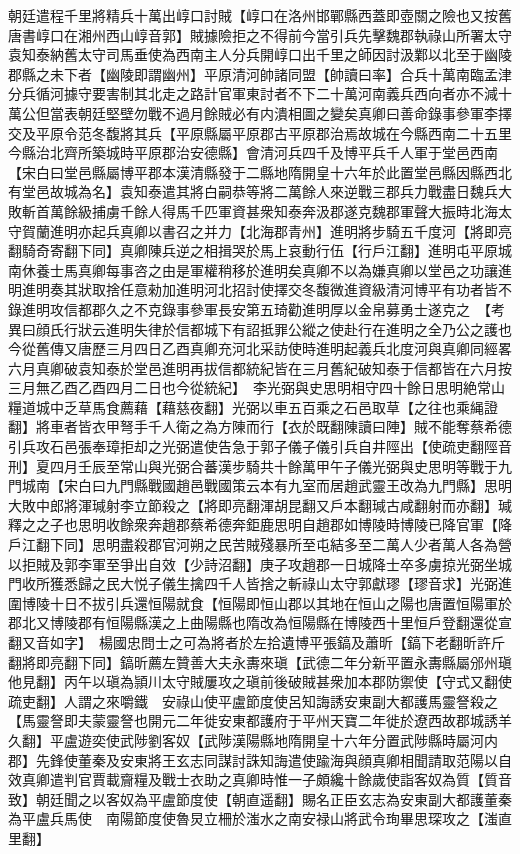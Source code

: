 朝廷遣程千里將精兵十萬出崞口討賊【崞口在洛州邯鄲縣西蓋即壺關之險也又按舊唐書崞口在湘州西山崞音郭】賊據險拒之不得前今當引兵先擊魏郡執祿山所署太守袁知泰納舊太守司馬垂使為西南主人分兵開崞口出千里之師因討汲鄴以北至于幽陵郡縣之未下者【幽陵即謂幽州】平原清河帥諸同盟【帥讀曰率】合兵十萬南臨孟津分兵循河據守要害制其北走之路計官軍東討者不下二十萬河南義兵西向者亦不減十萬公但當表朝廷堅壁勿戰不過月餘賊必有内潰相圖之變矣真卿曰善命錄事參軍李擇交及平原令范冬馥將其兵【平原縣屬平原郡古平原郡治焉故城在今縣西南二十五里今縣治北齊所築城時平原郡治安德縣】會清河兵四千及博平兵千人軍于堂邑西南【宋白曰堂邑縣屬博平郡本漢清縣發于二縣地隋開皇十六年於此置堂邑縣因縣西北有堂邑故城為名】袁知泰遣其將白嗣恭等將二萬餘人來逆戰三郡兵力戰盡日魏兵大敗斬首萬餘級捕虜千餘人得馬千匹軍資甚衆知泰奔汲郡遂克魏郡軍聲大振時北海太守賀蘭進明亦起兵真卿以書召之并力【北海郡青州】進明將步騎五千度河【將即亮翻騎奇寄翻下同】真卿陳兵逆之相揖哭於馬上哀動行伍【行戶江翻】進明屯平原城南休養士馬真卿每事咨之由是軍權稍移於進明矣真卿不以為嫌真卿以堂邑之功讓進明進明奏其狀取捨任意勑加進明河北招討使擇交冬馥微進資級清河博平有功者皆不錄進明攻信都郡久之不克錄事參軍長安第五琦勸進明厚以金帛募勇士遂克之　【考異曰顔氏行狀云進明失律於信都城下有詔抵罪公縱之使赴行在進明之全乃公之護也今從舊傳又唐歷三月四日乙酉真卿充河北采訪使時進明起義兵北度河與真卿同經畧六月真卿破袁知泰於堂邑進明再拔信都統紀皆在三月舊紀破知泰于信都皆在六月按三月無乙酉乙酉四月二日也今從統紀】　李光弼與史思明相守四十餘日思明絶常山糧道城中乏草馬食薦藉【藉慈夜翻】光弼以車五百乘之石邑取草【之往也乘䋲證翻】將車者皆衣甲弩手千人衛之為方陳而行【衣於既翻陳讀曰陣】賊不能奪蔡希德引兵攻石邑張奉璋拒却之光弼遣使告急于郭子儀子儀引兵自井陘出【使疏吏翻陘音刑】夏四月壬辰至常山與光弼合蕃漢步騎共十餘萬甲午子儀光弼與史思明等戰于九門城南【宋白曰九門縣戰國趙邑戰國策云本有九室而居趙武靈王改為九門縣】思明大敗中郎將渾瑊射李立節殺之【將即亮翻渾胡昆翻又戶本翻瑊古咸翻射而亦翻】瑊釋之之子也思明收餘衆奔趙郡蔡希德奔鉅鹿思明自趙郡如博陵時博陵已降官軍【降戶江翻下同】思明盡殺郡官河朔之民苦賊殘暴所至屯結多至二萬人少者萬人各為營以拒賊及郭李軍至爭出自效【少詩沼翻】庚子攻趙郡一日城降士卒多虜掠光弼坐城門收所獲悉歸之民大悦子儀生擒四千人皆捨之斬祿山太守郭獻璆【璆音求】光弼進圍博陵十日不拔引兵還恒陽就食【恒陽即恒山郡以其地在恒山之陽也唐置恒陽軍於郡北又博陵郡有恒陽縣漢之上曲陽縣也隋改為恒陽縣在博陵西十里恒戶登翻還從宣翻又音如字】　楊國忠問士之可為將者於左拾遺博平張鎬及蕭昕【鎬下老翻昕許斤翻將即亮翻下同】鎬昕薦左贊善大夫永夀來瑱【武德二年分新平置永夀縣屬邠州瑱他見翻】丙午以瑱為頴川太守賊屢攻之瑱前後破賊甚衆加本郡防禦使【守式又翻使疏吏翻】人謂之來嚼鐵　安祿山使平盧節度使呂知誨誘安東副大都護馬靈詧殺之【馬靈詧即夫蒙靈詧也開元二年徙安東都護府于平州天寶二年徙於遼西故郡城誘羊久翻】平盧遊奕使武陟劉客奴【武陟漢陽縣地隋開皇十六年分置武陟縣時屬河内郡】先鋒使董秦及安東將王玄志同謀討誅知誨遣使踰海與顔真卿相聞請取范陽以自效真卿遣判官賈載齎糧及戰士衣助之真卿時惟一子頗纔十餘歲使詣客奴為質【質音致】朝廷聞之以客奴為平盧節度使【朝直遥翻】賜名正臣玄志為安東副大都護董秦為平盧兵馬使　南陽節度使魯炅立柵於滍水之南安禄山將武令珣畢思琛攻之【滍直里翻】


